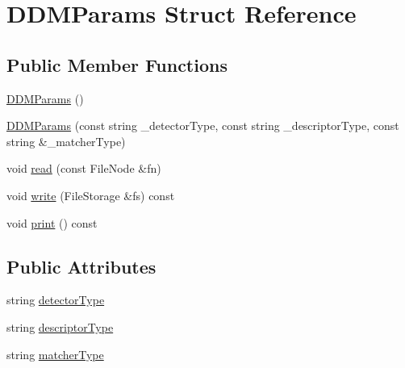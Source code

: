 \hypertarget{structDDMParams}{\section{D\-D\-M\-Params Struct Reference}
\label{structDDMParams}
}
\subsection*{Public Member Functions}
\begin{DoxyCompactItemize}
\item 
\hyperlink{structDDMParams_a32113468489a6bf149e967f1b62da042}{D\-D\-M\-Params} ()
\item 
\hyperlink{structDDMParams_a01e60a17b71a55ef052ceba97d9a370f}{D\-D\-M\-Params} (const string \-\_\-detector\-Type, const string \-\_\-descriptor\-Type, const string \&\-\_\-matcher\-Type)
\item 
void \hyperlink{structDDMParams_a13b08a3275f499f7f54efc6f61dbbf2e}{read} (const File\-Node \&fn)
\item 
void \hyperlink{structDDMParams_ab224e3aa884d7af5a95af51caa0a290a}{write} (File\-Storage \&fs) const 
\item 
void \hyperlink{structDDMParams_af49a52d391d8fe0d27942d47f46bc2d9}{print} () const 
\end{DoxyCompactItemize}
\subsection*{Public Attributes}
\begin{DoxyCompactItemize}
\item 
string \hyperlink{structDDMParams_a7a13119000263119c574f88b11f3f9a6}{detector\-Type}
\item 
string \hyperlink{structDDMParams_acd9a38edfafc783a97a4ede7337b48d7}{descriptor\-Type}
\item 
string \hyperlink{structDDMParams_abc008f2603cebb2aff44945b0a4f66a5}{matcher\-Type}
\end{DoxyCompactItemize}


